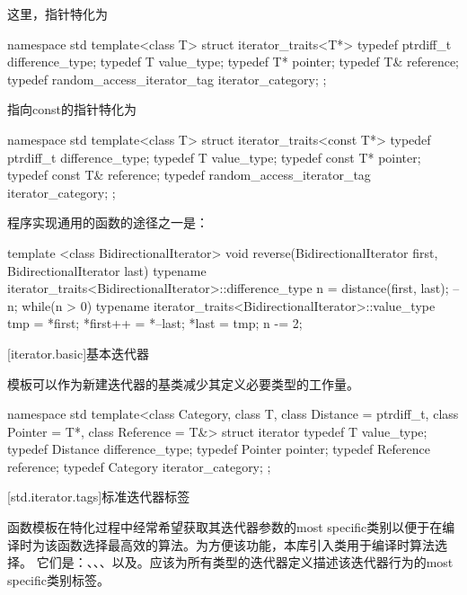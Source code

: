 \pnum
这里，指针特化为
\begin{codeblock}
namespace std {
  template<class T> struct iterator_traits<T*> {
    typedef ptrdiff_t difference_type;
    typedef T value_type;
    typedef T* pointer;
    typedef T& reference;
    typedef random_access_iterator_tag iterator_category;
  };
}
\end{codeblock}
指向const的指针特化为
\begin{codeblock}
namespace std {
  template<class T> struct iterator_traits<const T*> {
    typedef ptrdiff_t difference_type;
    typedef T value_type;
    typedef const T* pointer;
    typedef const T& reference;
    typedef random_access_iterator_tag iterator_category;
  };
}
\end{codeblock}

\pnum
\enterexample
\Cpp 程序实现通用的函数的途径之一是：
\begin{codeblock}
template <class BidirectionalIterator>
void reverse(BidirectionalIterator first, BidirectionalIterator last) {
  typename iterator_traits<BidirectionalIterator>::difference_type n =
    distance(first, last);
  --n;
  while(n > 0) {
    typename iterator_traits<BidirectionalIterator>::value_type
     tmp = *first;
    *first++ = *--last;
    *last = tmp;
    n -= 2;
  }
}
\end{codeblock}
\exitexample

[iterator.basic]{基本迭代器}

\pnum
{}模板可以作为新建迭代器的基类减少其定义必要类型的工作量。

\begin{codeblock}
namespace std {
  template<class Category, class T, class Distance = ptrdiff_t,
    class Pointer = T*, class Reference = T&>
  struct iterator {
    typedef T         value_type;
    typedef Distance  difference_type;
    typedef Pointer   pointer;
    typedef Reference reference;
    typedef Category  iterator_category;
  };
}
\end{codeblock}

[std.iterator.tags]{标准迭代器标签}

\pnum
{}%
%
%
%
%
函数模板在特化过程中经常希望获取其迭代器参数的most specific类别以便于在编译时为该函数选择最高效的算法。为方便该功能，本库引入类用于编译时算法选择。
它们是：、、、以及。应该为所有类型的迭代器定义描述该迭代器行为的most specific类别标签。

